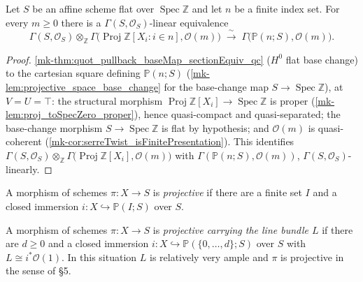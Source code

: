 \begin{theorem}\label{mk-thm:serreTwist_sections_baseChange}
  \leanok

  Let \(S\) be an affine scheme flat over \(\operatorname{Spec}
  \mathbb{Z}\) and let \(n\) be a finite index set. For every \(m \ge
  0\) there is a \(\Gamma(S, \mathcal{O}_S)\)-linear equivalence
  \[
    \Gamma(S, \mathcal{O}_S) \otimes_{\mathbb{Z}}
      \Gamma\bigl(\operatorname{Proj} \mathbb{Z}[X_i : i \in n],
      \mathcal{O}(m)\bigr)
    \;\xrightarrow{\ \sim\ }\;
    \Gamma\bigl(\mathbb{P}(n; S), \mathcal{O}(m)\bigr).
  \]
\end{theorem}
\begin{proof}
  \leanokApply \ref{mk-thm:quot_pullback_baseMap_sectionEquiv_qc} (\(H^0\) flat
  base change) to the cartesian square defining \(\mathbb{P}(n; S)\)
  (\ref{mk-lem:projective_space_base_change} for the base-change map
  \(S \to \operatorname{Spec} \mathbb{Z}\)), at \(V = U = \top\): the
  structural morphism
  \(\operatorname{Proj} \mathbb{Z}[X_i] \to \operatorname{Spec}
  \mathbb{Z}\) is proper (\ref{mk-lem:proj_toSpecZero_proper}), hence
  quasi-compact and quasi-separated; the base-change morphism
  \(S \to \operatorname{Spec} \mathbb{Z}\) is flat by hypothesis; and
  \(\mathcal{O}(m)\) is quasi-coherent
  (\ref{mk-cor:serreTwist_isFinitePresentation}). This identifies
  \(\Gamma(S, \mathcal{O}_S) \otimes_{\mathbb{Z}} \Gamma\bigl(
  \operatorname{Proj} \mathbb{Z}[X_i], \mathcal{O}(m)\bigr)\) with
  \(\Gamma(\mathbb{P}(n; S), \mathcal{O}(m))\), \(\Gamma(S,
  \mathcal{O}_S)\)-linearly.
\end{proof}

\begin{definition}
  \label{mk-def:projective_morphism}
  \leanok
  A morphism of schemes \(\pi : X \to S\) is \emph{projective} if there are a
  finite set \(I\) and a closed immersion
  \(i : X \hookrightarrow \mathbb{P}(I;S)\) over \(S\).
\end{definition}

\begin{definition}
  \label{mk-def:projective_with}
  \leanok
  A morphism of schemes \(\pi : X \to S\) is \emph{projective carrying the
  line bundle \(L\)} if there are \(d \ge 0\) and a closed immersion
  \(i : X \hookrightarrow \mathbb{P}(\{0,\dots,d\}; S)\) over \(S\) with
  \(L \cong i^* \mathcal{O}(1)\).  In this situation \(L\) is relatively
  very ample and \(\pi\) is projective in the sense of \cite{nitsure-hilbert-quot} \S 5.
\end{definition}

